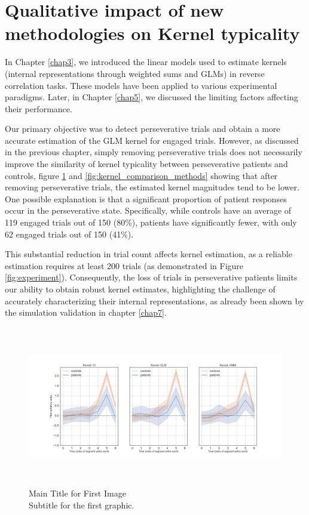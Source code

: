 \section{Qualitative impact of new methodologies on Kernel typicality}

In Chapter \ref{chap3}, we introduced the linear models used to estimate kernels (internal representations through weighted sums and GLMs) in reverse correlation tasks. These models have been applied to various experimental paradigms. Later, in Chapter \ref{chap5}, we discussed the limiting factors affecting their performance.

Our primary objective was to detect perseverative trials and obtain a more accurate estimation of the GLM kernel for engaged trials. However, as discussed in the previous chapter, simply removing perseverative trials does not necessarily improve the similarity of kernel typicality between perseverative patients and controls, figure \ref{fig:kernels_segments_methods} and \ref{fig:kernel_comparison_methods} showing that after removing perseverative trials, the estimated kernel magnitudes tend to be lower. One possible explanation is that a significant proportion of patient responses occur in the perseverative state. Specifically, while controls have an average of 119 engaged trials out of 150 (80\%), patients have significantly fewer, with only 62 engaged trials out of 150 (41\%).

This substantial reduction in trial count affects kernel estimation, as a reliable estimation requires at least 200 trials (as demonstrated in Figure \ref{fig:experiment}). Consequently, the loss of trials in perseverative patients limits our ability to obtain robust kernel estimates, highlighting the challenge of accurately characterizing their internal representations, as already been shown by the simulation validation in chapter \ref{chap7}.


\begin{figure}[H]
    \centering
    \includegraphics[width=17cm,height=7cm]{MainLayout/Images/chapter8/kernels_segments_methods.jpg}
    \caption{Main Title for First Image \\ \small Subtitle for the first graphic.}
    \label{fig:kernels_segments_methods}
\end{figure}

